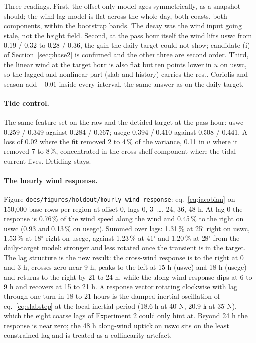 \documentclass[11pt]{article}
\newcommand{\code}[1]{\texttt{#1}}
\begin{document}
Three readings. First, the offset-only model ages symmetrically, as a snapshot should; the wind-lag model is flat across the whole day, both coasts, both components, within the bootstrap bands. The decay was the wind input going stale, not the height field. Second, at the pass hour itself the wind lifts uswc from 0.19 / 0.32 to 0.28 / 0.36, the gain the daily target could not show; candidate (i) of Section~\ref{sec:phase2} is confirmed and the other three are second order. Third, the linear wind at the target hour is also flat but ten points lower in $u$ on uswc, so the lagged and nonlinear part (slab and history) carries the rest. Coriolis and season add $+0.01$ inside every interval, the same answer as on the daily target.

\paragraph{Tide control.} The same feature set on the raw and the detided target at the pass hour: uswc 0.259 / 0.349 against 0.284 / 0.367; usegc 0.394 / 0.410 against 0.508 / 0.441. A loss of 0.02 where the fit removed 2 to 4\,\% of the variance, 0.11 in $u$ where it removed 7 to 8\,\%, concentrated in the cross-shelf component where the tidal current lives. Detiding stays.

\paragraph{The hourly wind response.} Figure \code{docs/figures/holdout/hourly\_wind\_response}: eq.~\eqref{eq:jacobian} on 150,000 base rows per region at offset 0, lags 0, 3, \dots, 24, 36, 48 h. At lag 0 the response is 0.76\,\% of the wind speed along the wind and 0.45\,\% to the right on uswc (0.93 and 0.13\,\% on usegc). Summed over lags: 1.31\,\% at 25$^\circ$ right on uswc, 1.53\,\% at 18$^\circ$ right on usegc, against 1.23\,\% at 41$^\circ$ and 1.20\,\% at 28$^\circ$ from the daily-target model: stronger and less rotated once the transient is in the target. The lag structure is the new result: the cross-wind response is to the right at 0 and 3 h, crosses zero near 9 h, peaks to the left at 15 h (uswc) and 18 h (usegc) and returns to the right by 21 to 24 h, while the along-wind response dips at 6 to 9 h and recovers at 15 to 21 h. A response vector rotating clockwise with lag through one turn in 18 to 21 hours is the damped inertial oscillation of eq.~\eqref{eq:slabstep} at the local inertial period (18.6 h at 40$^\circ$N, 20.9 h at 35$^\circ$N), which the eight coarse lags of Experiment 2 could only hint at. Beyond 24 h the response is near zero; the 48 h along-wind uptick on uswc sits on the least constrained lag and is treated as a collinearity artefact.
\end{document}
